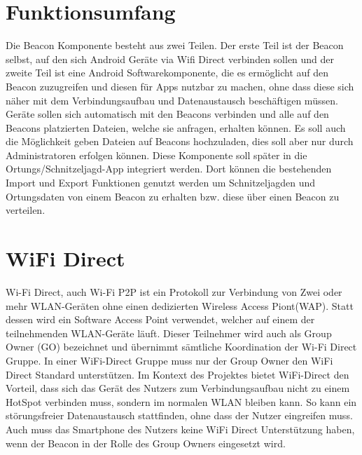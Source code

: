\section{Funktionsumfang}
Die Beacon Komponente besteht aus zwei Teilen. Der erste Teil ist der Beacon selbst, auf den sich Android Geräte via Wifi Direct verbinden sollen und der zweite Teil ist eine Android Softwarekomponente, die es ermöglicht auf den Beacon zuzugreifen und diesen für Apps nutzbar zu machen, ohne dass diese sich näher mit dem Verbindungsaufbau und Datenaustausch beschäftigen müssen. Geräte sollen sich automatisch mit den Beacons verbinden und alle auf den Beacons platzierten Dateien, welche sie anfragen, erhalten können. Es soll auch die Möglichkeit geben Dateien auf Beacons hochzuladen, dies soll aber nur durch Administratoren erfolgen können. Diese Komponente soll später in die Ortungs/Schnitzeljagd-App integriert werden. Dort können die bestehenden Import und Export Funktionen genutzt werden um Schnitzeljagden und Ortungsdaten von einem Beacon zu erhalten bzw. diese über einen Beacon zu verteilen.

\section{WiFi Direct}
Wi-Fi Direct, auch Wi-Fi P2P ist ein Protokoll zur Verbindung von Zwei oder mehr WLAN-Geräten ohne einen dedizierten Wireless Access Piont(WAP).
Statt dessen wird ein Software Access Point verwendet, welcher auf einem der teilnehmenden WLAN-Geräte läuft. Dieser Teilnehmer wird auch als Group Owner (GO) bezeichnet und übernimmt sämtliche Koordination der Wi-Fi Direct Gruppe. In einer WiFi-Direct Gruppe muss nur der Group Owner den WiFi Direct Standard unterstützen. Im Kontext des Projektes bietet WiFi-Direct den Vorteil, dass sich das Gerät des Nutzers zum Verbindungsaufbau nicht zu einem HotSpot verbinden muss, sondern im normalen WLAN bleiben kann. So kann ein störungsfreier Datenaustausch stattfinden, ohne dass der Nutzer eingreifen muss. Auch muss das Smartphone des Nutzers keine WiFi Direct Unterstützung haben, wenn der Beacon in der Rolle des Group Owners eingesetzt wird.

